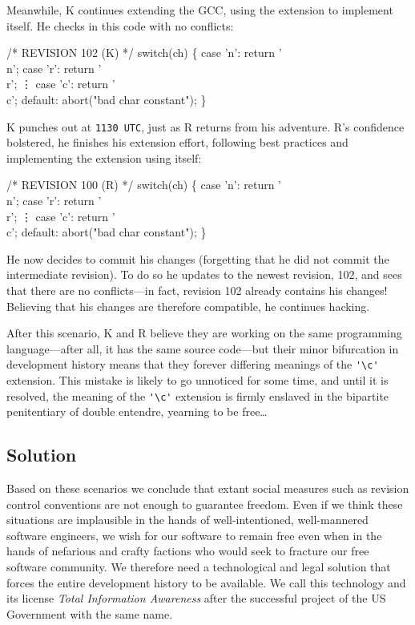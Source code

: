 \documentclass[twocolumn]{article}
\begin{document}
Meanwhile, K continues extending the GCC, using the extension to
implement itself. He checks in this code with no conflicts:
%
\begin{code}
/* REVISION 102 (K) */
switch(ch) \{
  case 'n': return '\\n';
  case 'r': return '\\r';
  \vdots
  case 'c': return '\\c';
  default: abort("bad char constant");
\}
\end{code}
%
K punches out at {\tt 1130 UTC},\z{}
just as R returns from his adventure. R's confidence bolstered, he
finishes his extension effort, following best practices and
implementing the extension using itself:
%
\begin{code}
/* REVISION 100 (R) */
switch(ch) \{
  case 'n': return '\\n';
  case 'r': return '\\r';
  \vdots
  case 'c': return '\\c';
  default: abort("bad char constant");
\}
\end{code}
%
He now decides to commit his changes (forgetting that he did not
commit the intermediate revision). To do so he updates to the newest
revision, 102, and sees that there are no conflicts---in fact,
revision 102 already contains his changes! Believing that his changes
are therefore compatible, he continues hacking.

After this scenario, K and R believe they are working on the same
programming language---after all, it has the same source code---but
their minor bifurcation in development history means that they forever
differing meanings of the \verb+'\c'+ extension. This mistake is
likely to go unnoticed for some time, and until it is resolved, the
meaning of the \verb+'\c'+ extension is firmly enslaved in the
bipartite penitentiary of double entendre, yearning to be
free\ldots\z{}

\subsection{Solution}

Based on these scenarios we conclude that extant social measures such
as revision control conventions are not enough to guarantee freedom.
Even if we think these situations are implausible in the hands of
well-intentioned, well-mannered software engineers, we wish for our
software to remain free even when in the hands of nefarious and crafty
factions who would seek to fracture
our free software community. We therefore need a technological and
legal solution that forces the entire development history to be
available. We call this technology and its license {\em Total
Information Awareness} after the successful project of the US
Government with the same name.\z{}
\end{document}
